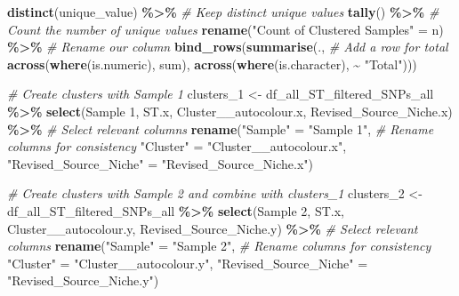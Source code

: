 \documentclass[
]{article}
\newenvironment{Shaded}{\begin{snugshade}}{\end{snugshade}}
\newcommand{\AttributeTok}[1]{\textcolor[rgb]{0.13,0.29,0.53}{#1}}
\newcommand{\CommentTok}[1]{\textcolor[rgb]{0.56,0.35,0.01}{\textit{#1}}}
\newcommand{\FunctionTok}[1]{\textcolor[rgb]{0.13,0.29,0.53}{\textbf{#1}}}
\newcommand{\NormalTok}[1]{#1}
\newcommand{\OtherTok}[1]{\textcolor[rgb]{0.56,0.35,0.01}{#1}}
\newcommand{\SpecialCharTok}[1]{\textcolor[rgb]{0.81,0.36,0.00}{\textbf{#1}}}
\newcommand{\StringTok}[1]{\textcolor[rgb]{0.31,0.60,0.02}{#1}}
\begin{document}
\begin{Shaded}
\begin{Highlighting}[]
  \FunctionTok{distinct}\NormalTok{(unique\_value) }\SpecialCharTok{\%\textgreater{}\%}                    \CommentTok{\# Keep distinct unique values}
  \FunctionTok{tally}\NormalTok{() }\SpecialCharTok{\%\textgreater{}\%}                                   \CommentTok{\# Count the number of unique values}
  \FunctionTok{rename}\NormalTok{(}\StringTok{"Count of Clustered Samples"} \OtherTok{=}\NormalTok{ n)  }\SpecialCharTok{\%\textgreater{}\%} \CommentTok{\# Rename our column}
  \FunctionTok{bind\_rows}\NormalTok{(}\FunctionTok{summarise}\NormalTok{(.,                        }\CommentTok{\# Add a row for total}
                      \FunctionTok{across}\NormalTok{(}\FunctionTok{where}\NormalTok{(is.numeric), sum),}
                      \FunctionTok{across}\NormalTok{(}\FunctionTok{where}\NormalTok{(is.character), }\SpecialCharTok{\textasciitilde{}} \StringTok{"Total"}\NormalTok{)))}

\CommentTok{\# Create clusters with Sample 1}
\NormalTok{clusters\_1 }\OtherTok{\textless{}{-}}\NormalTok{ df\_all\_ST\_filtered\_SNPs\_all }\SpecialCharTok{\%\textgreater{}\%}
  \FunctionTok{select}\NormalTok{(}\StringTok{\textasciigrave{}}\AttributeTok{Sample 1}\StringTok{\textasciigrave{}}\NormalTok{, ST.x, Cluster\_\_autocolour.x, Revised\_Source\_Niche.x) }\SpecialCharTok{\%\textgreater{}\%} \CommentTok{\# Select relevant columns}
  \FunctionTok{rename}\NormalTok{(}\StringTok{"Sample"} \OtherTok{=} \StringTok{"Sample 1"}\NormalTok{,                }\CommentTok{\# Rename columns for consistency}
         \StringTok{"Cluster"} \OtherTok{=} \StringTok{"Cluster\_\_autocolour.x"}\NormalTok{, }
         \StringTok{"Revised\_Source\_Niche"} \OtherTok{=} \StringTok{"Revised\_Source\_Niche.x"}\NormalTok{)}

\CommentTok{\# Create clusters with Sample 2 and combine with clusters\_1}
\NormalTok{clusters\_2 }\OtherTok{\textless{}{-}}\NormalTok{ df\_all\_ST\_filtered\_SNPs\_all }\SpecialCharTok{\%\textgreater{}\%}
  \FunctionTok{select}\NormalTok{(}\StringTok{\textasciigrave{}}\AttributeTok{Sample 2}\StringTok{\textasciigrave{}}\NormalTok{, ST.x, Cluster\_\_autocolour.y, Revised\_Source\_Niche.y) }\SpecialCharTok{\%\textgreater{}\%} \CommentTok{\# Select relevant columns}
  \FunctionTok{rename}\NormalTok{(}\StringTok{"Sample"} \OtherTok{=} \StringTok{"Sample 2"}\NormalTok{,                }\CommentTok{\# Rename columns for consistency}
         \StringTok{"Cluster"} \OtherTok{=} \StringTok{"Cluster\_\_autocolour.y"}\NormalTok{, }
         \StringTok{"Revised\_Source\_Niche"} \OtherTok{=} \StringTok{"Revised\_Source\_Niche.y"}\NormalTok{)}


\end{Highlighting}
\end{Shaded}
\end{document}
